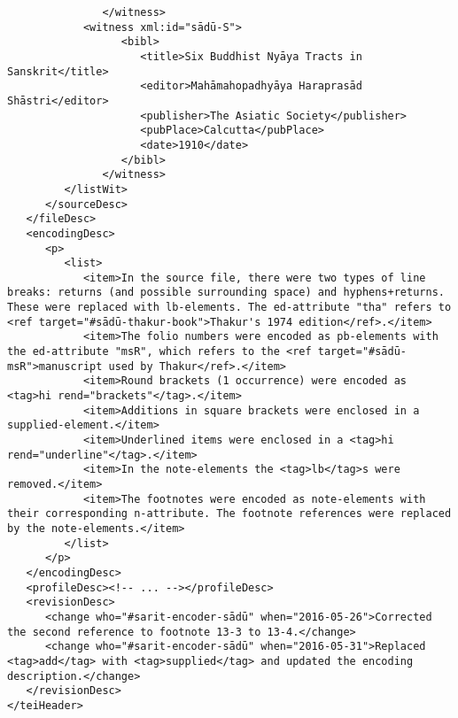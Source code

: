 \documentclass[article,12pt,a4paper]{memoir}%
\begin{document}
\begin{verbatim}
	           </witness>
            <witness xml:id="sādū-S">
	              <bibl>
	                 <title>Six Buddhist Nyāya Tracts in Sanskrit</title>
	                 <editor>Mahāmahopadhyāya Haraprasād Shāstri</editor>
	                 <publisher>The Asiatic Society</publisher>
	                 <pubPlace>Calcutta</pubPlace>
	                 <date>1910</date>
	              </bibl>
	           </witness>
         </listWit>
      </sourceDesc>
   </fileDesc>
   <encodingDesc>
      <p>
         <list>
            <item>In the source file, there were two types of line breaks: returns (and possible surrounding space) and hyphens+returns. These were replaced with lb-elements. The ed-attribute "tha" refers to <ref target="#sādū-thakur-book">Thakur's 1974 edition</ref>.</item>
            <item>The folio numbers were encoded as pb-elements with the ed-attribute "msR", which refers to the <ref target="#sādū-msR">manuscript used by Thakur</ref>.</item>
            <item>Round brackets (1 occurrence) were encoded as <tag>hi rend="brackets"</tag>.</item>
            <item>Additions in square brackets were enclosed in a supplied-element.</item>
            <item>Underlined items were enclosed in a <tag>hi rend="underline"</tag>.</item>
            <item>In the note-elements the <tag>lb</tag>s were removed.</item>
            <item>The footnotes were encoded as note-elements with their corresponding n-attribute. The footnote references were replaced by the note-elements.</item>
         </list>
      </p>
   </encodingDesc>
   <profileDesc><!-- ... --></profileDesc>
   <revisionDesc>
      <change who="#sarit-encoder-sādū" when="2016-05-26">Corrected the second reference to footnote 13-3 to 13-4.</change>
      <change who="#sarit-encoder-sādū" when="2016-05-31">Replaced <tag>add</tag> with <tag>supplied</tag> and updated the encoding description.</change>
   </revisionDesc>
</teiHeader>
	 \end{verbatim}
       
      \clearpage
      \begin{english}
      \printshorthands
      \printbibliography
      \end{english}
    
\end{document}
